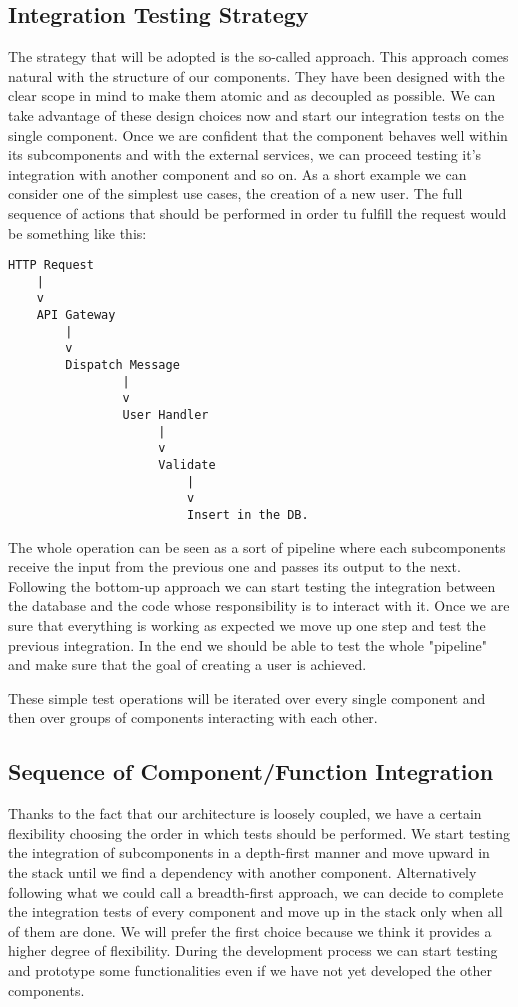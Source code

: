 \subsection{Integration Testing Strategy}
The strategy that will be adopted is the so-called  approach.
This approach comes natural with the structure of our components. They have been
designed with the clear scope in mind to make them atomic and as decoupled as possible.
We can take advantage of these design choices now and start our integration tests
on the single component. Once we are confident that the component behaves
well within its subcomponents and with the external services, we can proceed testing
it's integration with another component and so on.
As a short example we can consider one of the simplest use cases, the creation of a new user.
The full sequence of actions that should be performed in order tu fulfill the request
would be something like this:
\lstset{basicstyle=\ttfamily\footnotesize,breaklines=true}
\begin{lstlisting}
HTTP Request
    |
    v
    API Gateway
        |
        v
        Dispatch Message
                |
                v 
                User Handler
                     |
                     v
                     Validate
                         |
                         v
                         Insert in the DB.
\end{lstlisting}
The whole operation can be seen as a sort of pipeline where each subcomponents
receive the input from the previous one and passes its output to the next.
Following the bottom-up approach we can start testing the integration between the
database and the code whose responsibility is to interact with it. Once we are sure
that everything is working as expected we move up one step and test the previous integration.
In the end we should be able to test the whole "pipeline" and make sure that the
goal of creating a user is achieved.

These simple test operations will be iterated over every single component and then
over groups of components interacting with each other.

\subsection{Sequence of Component/Function Integration}
Thanks to the fact that our architecture is loosely coupled, we have a certain flexibility
choosing the order in which tests should be performed.
We start testing the integration of subcomponents in a depth-first manner and
move upward in the stack until we find a dependency with another component.
Alternatively following what we could call a breadth-first approach,
we can decide to complete the integration tests of every component and
move up in the stack only when all of them are done.
We will prefer the first choice because we think it provides a higher degree of
flexibility. During the development process we can start testing and prototype
some functionalities even if we have not yet developed the other components.
